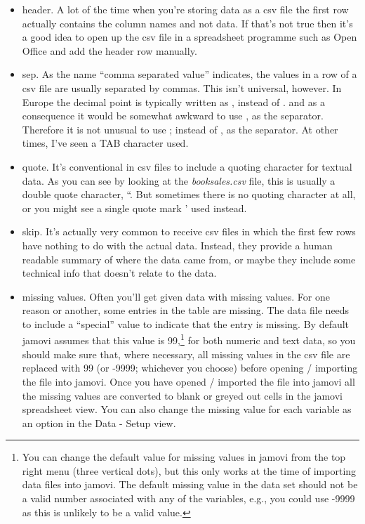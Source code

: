 \documentclass[
  a4paper,
]{book}
\providecommand{\tightlist}{%
  \setlength{\itemsep}{0pt}\setlength{\parskip}{0pt}}\usepackage{longtable,booktabs,array}
\begin{document}
\begin{itemize}
\tightlist
\item
  header. A lot of the time when you're storing data as a csv file the
  first row actually contains the column names and not data. If that's
  not true then it's a good idea to open up the csv file in a
  spreadsheet programme such as Open Office and add the header row
  manually.
\item
  sep. As the name ``comma separated value'' indicates, the values in a
  row of a csv file are usually separated by commas. This isn't
  universal, however. In Europe the decimal point is typically written
  as , instead of . and as a consequence it would be somewhat awkward to
  use , as the separator. Therefore it is not unusual to use ; instead
  of , as the separator. At other times, I've seen a TAB character used.
\item
  quote. It's conventional in csv files to include a quoting character
  for textual data. As you can see by looking at the
  \emph{booksales.csv} file, this is usually a double quote character,
  ``. But sometimes there is no quoting character at all, or you might
  see a single quote mark ' used instead.
\item
  skip. It's actually very common to receive csv files in which the
  first few rows have nothing to do with the actual data. Instead, they
  provide a human readable summary of where the data came from, or maybe
  they include some technical info that doesn't relate to the data.
\item
  missing values. Often you'll get given data with missing values. For
  one reason or another, some entries in the table are missing. The data
  file needs to include a ``special'' value to indicate that the entry
  is missing. By default jamovi assumes that this value is
  99,\footnote{You can change the default value for missing values in
    jamovi from the top right menu (three vertical dots), but this only
    works at the time of importing data files into jamovi. The default
    missing value in the data set should not be a valid number
    associated with any of the variables, e.g., you could use -9999 as
    this is unlikely to be a valid value.} for both numeric and text
  data, so you should make sure that, where necessary, all missing
  values in the csv file are replaced with 99 (or -9999; whichever you
  choose) before opening / importing the file into jamovi. Once you have
  opened / imported the file into jamovi all the missing values are
  converted to blank or greyed out cells in the jamovi spreadsheet view.
  You can also change the missing value for each variable as an option
  in the Data - Setup view.
\end{itemize}
\end{document}
